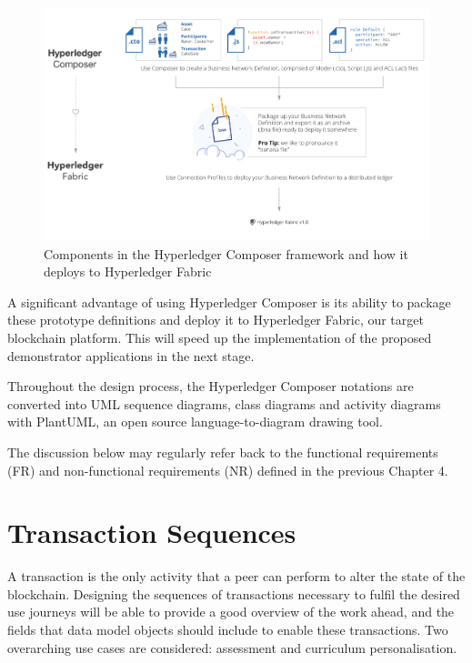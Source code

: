 \begin{figure}[!ht]
	\centering
	\includegraphics[width=1.0\textwidth]{composer2fabric}
	\caption[Hyperledger Composer]
	{Components in the Hyperledger Composer framework and how it deploys to
		Hyperledger Fabric \citep{cuicapuza2017composer}}
	\label{fig:composer2fabric}
\end{figure}

A significant advantage of using Hyperledger Composer is its ability to package these
prototype definitions and deploy it to Hyperledger Fabric, our target blockchain platform.
This will speed up the implementation of the proposed demonstrator applications
in the next stage.

Throughout the design process, the Hyperledger Composer notations are converted into UML sequence
diagrams, class diagrams and activity diagrams with PlantUML, an open source language-to-diagram drawing tool.

The discussion below may regularly refer back to the functional requirements (FR) and
non-functional requirements (NR) defined in the previous Chapter 4.

\section{Transaction Sequences}

A transaction is the only activity that a peer can perform to alter the state of the blockchain.
Designing the sequences of transactions necessary to fulfil the desired use journeys will
be able to provide a good overview of the work ahead, and the fields that data model
objects should include to enable these transactions. Two overarching use cases are considered:
assessment and curriculum personalisation.


